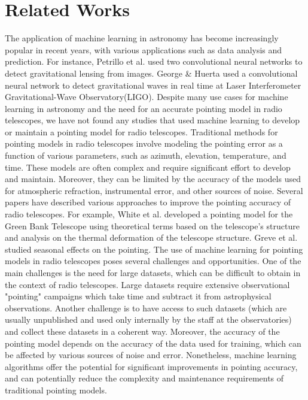 \section{Related Works}
The application of machine learning in astronomy has become increasingly popular in recent years, with various applications such as data analysis and prediction.
For instance, Petrillo et al. \cite{mlastgravlens} used two convolutional neural networks to detect gravitational lensing from images.
George \& Huerta \cite{mlastgravitationalwaves} used a convolutional neural network to detect gravitational waves in real time at Laser Interferometer Gravitational-Wave Observatory(LIGO).
Despite many use cases for machine learning in astronomy and the need for an accurate pointing model in radio telescopes,
we have not found any studies that used machine learning to develop or maintain a pointing model for radio telescopes.
Traditional methods for pointing models in radio telescopes involve modeling the pointing error as a function of various parameters, such as azimuth, elevation, temperature, and time.
These models are often complex and require significant effort to develop and maintain.
Moreover, they can be limited by the accuracy of the models used for atmospheric refraction, instrumental error, and other sources of noise.
Several papers have described various approaches to improve the pointing accuracy of radio telescopes.
For example, White et al. \cite{whitegreen2022} developed a pointing model for the Green Bank Telescope using theoretical terms based on the telescope's structure and analysis on the thermal deformation of the telescope structure.
Greve et al. \cite{greve1996pointing} studied seasonal effects on the pointing.
The use of machine learning for pointing models in radio telescopes poses several challenges and opportunities.
One of the main challenges is the need for large datasets, which can be difficult to obtain in the context of radio telescopes.
Large datasets require extensive observational "pointing" campaigns which take time and subtract it from astrophysical observations.
Another challenge is to have access to such datasets (which are usually unpublished and used only internally by the staff at the observatories)
and collect these datasets in a coherent way. 
Moreover, the accuracy of the pointing model depends on the accuracy of the data used for training, which can be affected by various sources of noise and error.
Nonetheless, machine learning algorithms offer the potential for significant improvements in pointing accuracy,
and can potentially reduce the complexity and maintenance requirements of traditional pointing models.
